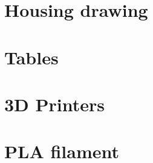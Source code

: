 \documentclass[a4paper,twoside,11pt]{report}
\begin{document}
\begin{appendix}
    \chapter{Housing drawing}
        

    \chapter{Tables}
        
        
    \chapter{3D Printers}
        
        
    \chapter{PLA filament}
        
        
\end{appendix}

\printbibliography[
heading=bibintoc,
title={Bibliography}
]
\end{document}
